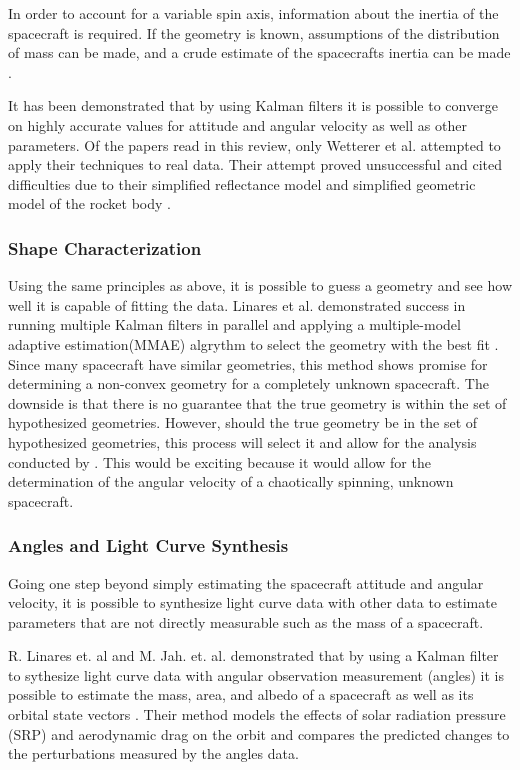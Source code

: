 \documentclass{article}
\begin{document}
In order to account for a variable spin axis, information about the inertia of the spacecraft is required. If the geometry is known, assumptions of the distribution of mass can be made, and a crude estimate of the spacecrafts inertia can be made \cite{LINARES20141}.

It has been demonstrated that by using Kalman filters it is possible to converge on highly accurate values for attitude and angular velocity as well as other parameters. Of the papers read in this review, only Wetterer et al. attempted to apply their techniques to real data. Their attempt proved unsuccessful and cited difficulties due to their simplified reflectance model and simplified geometric model of the rocket body \cite{AttitudeEstimationFromLightCurve}.


\subsubsection{Shape Characterization}

Using the same principles as above, it is possible to guess a geometry and see how well it is capable of fitting the data. Linares et al. demonstrated success in running multiple Kalman filters in parallel and applying a multiple-model adaptive estimation(MMAE) algrythm to select the geometry with the best fit \cite{SpaceObjectCharacterization}. Since many spacecraft have similar geometries, this method shows promise for determining a non-convex geometry for a completely unknown spacecraft. The downside is that there is no guarantee that the true geometry is within the set of hypothesized geometries. However, should the true geometry be in the set of hypothesized geometries, this process will select it and allow for the analysis conducted by \cite{AttitudeEstimationFromLightCurve}. This would be exciting because it would allow for the determination of the angular velocity of a chaotically spinning, unknown spacecraft.

\subsubsection{Angles and Light Curve Synthesis}

Going one step beyond simply estimating the spacecraft attitude and angular velocity, it is possible to synthesize light curve data with other data to estimate parameters that are not directly measurable such as the mass of a spacecraft.

R. Linares et. al  and M. Jah. et. al. demonstrated that by using a Kalman filter to sythesize light curve data with angular observation measurement (angles) it is possible to estimate the mass, area, and albedo of a spacecraft \cite{LINARES20141} as well as its orbital state vectors \cite{StateAndParameter}. Their method models the effects of solar radiation pressure (SRP) and aerodynamic drag on the orbit and compares the predicted changes to the perturbations measured by the angles data. 
\end{document}
